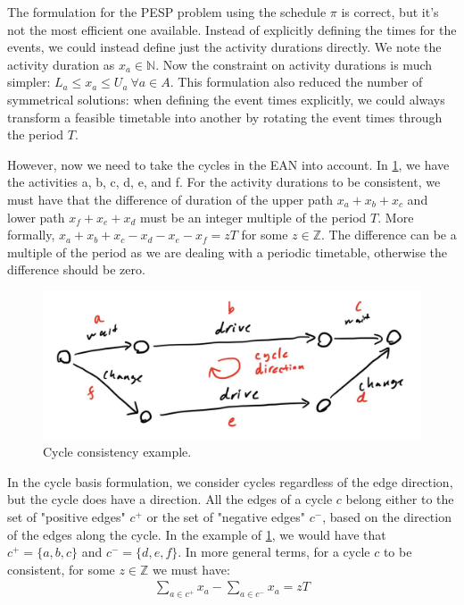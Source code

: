 \documentclass[english, 12pt, a4paper, sci, utf8, a-2b, online]{aaltothesis}
\newcommand{\N}{\mathbb{N}}
\newcommand{\Z}{\mathbb{Z}}
\begin{document}


The formulation for the PESP problem using the schedule $\pi$ is correct, but it's not the most efficient one available. Instead of explicitly defining the times for the events, we could instead define just the activity durations directly. We note the activity duration as $x_a \in \N$. Now the constraint on activity durations is much simpler: $L_a \leq x_a \leq U_a\ \forall a \in A$. This formulation also reduced the number of symmetrical solutions: when defining the event times explicitly, we could always transform a feasible timetable into another by rotating the event times through the period $T$.

However, now we need to take the cycles in the EAN into account. In \cref{fig:cycle-example}, we have the activities a, b, c, d, e, and f. For the activity durations to be consistent, we must have that the difference of duration of the upper path $x_a + x_b + x_c$ and lower path $x_f + x_e + x_d$ must be an integer multiple of the period $T$. More formally, $x_a + x_b + x_c - x_d - x_e - x_f = zT$ for some $z\in \Z$. The difference can be a multiple of the period as we are dealing with a periodic timetable, otherwise the difference should be zero.

\begin{figure}
    \centering
    \includegraphics[width=\textwidth]{figures/cycle-basis-demo.jpg}
    \caption{Cycle consistency example.}
    \label{fig:cycle-example}
\end{figure}

In the cycle basis formulation, we consider cycles regardless of the edge direction, but the cycle does have a direction. All the edges of a cycle $c$ belong either to the set of "positive edges" $c^+$ or the set of "negative edges" $c^-$, based on the direction of the edges along the cycle. In the example of \cref{fig:cycle-example}, we would have that $c^+ = \{a, b, c\}$ and $c^- = \{d, e, f\}$. In more general terms, for a cycle $c$ to be consistent, for some $z \in \Z$ we must have:
\begin{align}
    \sum_{a\in c^+}x_a - \sum_{a \in c^-}x_a = zT
\end{align}
\end{document}
